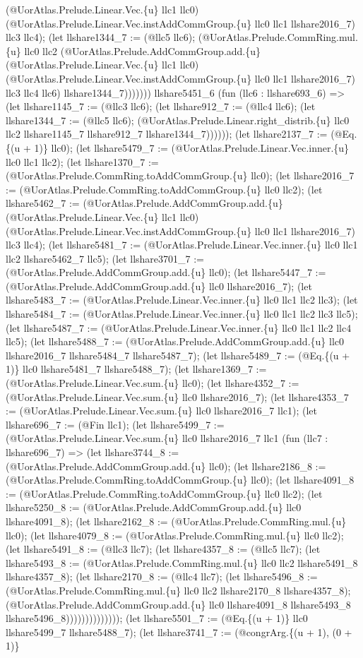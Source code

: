 \documentclass[11pt]{article}
\begin{document}
(@UorAtlas.Prelude.Linear.Vec.\{u\} llc1 llc0) (@UorAtlas.Prelude.Linear.Vec.instAddCommGroup.\{u\} llc0 llc1 llshare2016\_7) llc3 llc4); (let llshare1344\_7 := (@llc5 llc6); (@UorAtlas.Prelude.CommRing.mul.\{u\} llc0 llc2 (@UorAtlas.Prelude.AddCommGroup.add.\{u\} (@UorAtlas.Prelude.Linear.Vec.\{u\} llc1 llc0) (@UorAtlas.Prelude.Linear.Vec.instAddCommGroup.\{u\} llc0 llc1 llshare2016\_7) llc3 llc4 llc6) llshare1344\_7))))))) llshare5451\_6 (fun (llc6 : llshare693\_6) => (let llshare1145\_7 := (@llc3 llc6); (let llshare912\_7 := (@llc4 llc6); (let llshare1344\_7 := (@llc5 llc6); (@UorAtlas.Prelude.Linear.right\_distrib.\{u\} llc0 llc2 llshare1145\_7 llshare912\_7 llshare1344\_7)))))); (let llshare2137\_7 := (@Eq.\{(u + 1)\} llc0); (let llshare5479\_7 := (@UorAtlas.Prelude.Linear.Vec.inner.\{u\} llc0 llc1 llc2); (let llshare1370\_7 := (@UorAtlas.Prelude.CommRing.toAddCommGroup.\{u\} llc0); (let llshare2016\_7 := (@UorAtlas.Prelude.CommRing.toAddCommGroup.\{u\} llc0 llc2); (let llshare5462\_7 := (@UorAtlas.Prelude.AddCommGroup.add.\{u\} (@UorAtlas.Prelude.Linear.Vec.\{u\} llc1 llc0) (@UorAtlas.Prelude.Linear.Vec.instAddCommGroup.\{u\} llc0 llc1 llshare2016\_7) llc3 llc4); (let llshare5481\_7 := (@UorAtlas.Prelude.Linear.Vec.inner.\{u\} llc0 llc1 llc2 llshare5462\_7 llc5); (let llshare3701\_7 := (@UorAtlas.Prelude.AddCommGroup.add.\{u\} llc0); (let llshare5447\_7 := (@UorAtlas.Prelude.AddCommGroup.add.\{u\} llc0 llshare2016\_7); (let llshare5483\_7 := (@UorAtlas.Prelude.Linear.Vec.inner.\{u\} llc0 llc1 llc2 llc3); (let llshare5484\_7 := (@UorAtlas.Prelude.Linear.Vec.inner.\{u\} llc0 llc1 llc2 llc3 llc5); (let llshare5487\_7 := (@UorAtlas.Prelude.Linear.Vec.inner.\{u\} llc0 llc1 llc2 llc4 llc5); (let llshare5488\_7 := (@UorAtlas.Prelude.AddCommGroup.add.\{u\} llc0 llshare2016\_7 llshare5484\_7 llshare5487\_7); (let llshare5489\_7 := (@Eq.\{(u + 1)\} llc0 llshare5481\_7 llshare5488\_7); (let llshare1369\_7 := (@UorAtlas.Prelude.Linear.Vec.sum.\{u\} llc0); (let llshare4352\_7 := (@UorAtlas.Prelude.Linear.Vec.sum.\{u\} llc0 llshare2016\_7); (let llshare4353\_7 := (@UorAtlas.Prelude.Linear.Vec.sum.\{u\} llc0 llshare2016\_7 llc1); (let llshare696\_7 := (@Fin llc1); (let llshare5499\_7 := (@UorAtlas.Prelude.Linear.Vec.sum.\{u\} llc0 llshare2016\_7 llc1 (fun (llc7 : llshare696\_7) => (let llshare3744\_8 := (@UorAtlas.Prelude.AddCommGroup.add.\{u\} llc0); (let llshare2186\_8 := (@UorAtlas.Prelude.CommRing.toAddCommGroup.\{u\} llc0); (let llshare4091\_8 := (@UorAtlas.Prelude.CommRing.toAddCommGroup.\{u\} llc0 llc2); (let llshare5250\_8 := (@UorAtlas.Prelude.AddCommGroup.add.\{u\} llc0 llshare4091\_8); (let llshare2162\_8 := (@UorAtlas.Prelude.CommRing.mul.\{u\} llc0); (let llshare4079\_8 := (@UorAtlas.Prelude.CommRing.mul.\{u\} llc0 llc2); (let llshare5491\_8 := (@llc3 llc7); (let llshare4357\_8 := (@llc5 llc7); (let llshare5493\_8 := (@UorAtlas.Prelude.CommRing.mul.\{u\} llc0 llc2 llshare5491\_8 llshare4357\_8); (let llshare2170\_8 := (@llc4 llc7); (let llshare5496\_8 := (@UorAtlas.Prelude.CommRing.mul.\{u\} llc0 llc2 llshare2170\_8 llshare4357\_8); (@UorAtlas.Prelude.AddCommGroup.add.\{u\} llc0 llshare4091\_8 llshare5493\_8 llshare5496\_8)))))))))))))); (let llshare5501\_7 := (@Eq.\{(u + 1)\} llc0 llshare5499\_7 llshare5488\_7); (let llshare3741\_7 := (@congrArg.\{(u + 1), (0 + 1)\} 
\end{document}
